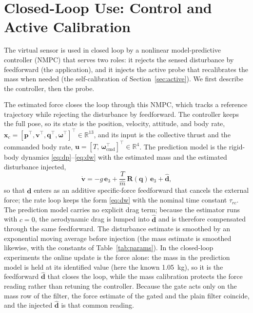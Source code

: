 \documentclass[lettersize,journal]{IEEEtran}
\newcommand{\R}{\mathbb{R}}
\newcommand{\vect}[1]{\bm{#1}}
\newcommand{\mat}[1]{\mathbf{#1}}
\begin{document}
\section{Closed-Loop Use: Control and Active Calibration}\label{sec:nmpc}

The virtual sensor is used in closed loop by a nonlinear model-predictive
controller (NMPC) that serves two roles: it rejects the sensed disturbance by
feedforward (the application), and it injects the active probe that recalibrates
the mass when needed (the self-calibration of Section~\ref{sec:active}). We first
describe the controller, then the probe.

The estimated force closes the loop through this NMPC, which
tracks a reference trajectory while rejecting the
disturbance by feedforward. The controller keeps the full pose, so its state is
the position, velocity, attitude, and body rate,
$\vect{x}_c=[\vect{p}^{\!\top},\vect{v}^{\!\top},\vect{q}^{\!\top},\vect{\omega}^{\!\top}]^{\!\top}\in\R^{13}$,
and its input is the collective thrust and the commanded body rate,
$\vect{u}=[T,\,\vect{\omega}_{\text{cmd}}^{\!\top}]^{\!\top}\in\R^{4}$. The
prediction model is the rigid-body dynamics
\eqref{eq:dp}--\eqref{eq:dw} with the estimated mass and the estimated
disturbance injected,
\begin{equation}
\dot{\vect{v}} = -g\,\vect{e}_3 + \frac{T}{\hat{m}}\,\mat{R}(\vect{q})\,\vect{e}_3
                  + \hat{\vect{d}},
\label{eq:nmpc-dyn}
\end{equation}
so that $\hat{\vect{d}}$ enters as an additive specific-force feedforward that
cancels the external force; the rate loop keeps the form \eqref{eq:dw} with the
nominal time constant $\tau_{rc}$. The prediction model carries no explicit drag term; because the
estimator runs with $c=0$, the aerodynamic drag is lumped into $\hat{\vect{d}}$
and is therefore compensated through the same feedforward. The disturbance
estimate is smoothed by an exponential moving average before injection (the mass
estimate is smoothed likewise, with the constants of Table~\ref{tab:params}). In the
closed-loop experiments the online update is the force alone: the mass in the
prediction model is held at its identified value (here the known
\SI{1.05}{\kilogram}), so it is the feedforward $\hat{\vect{d}}$ that closes the
loop, while the mass calibration protects the force reading rather than
retuning the controller. Because the gate acts only on the mass row of the
filter, the force estimate of the gated and the plain filter coincide, and the
injected $\hat{\vect{d}}$ is that common reading.
\end{document}
